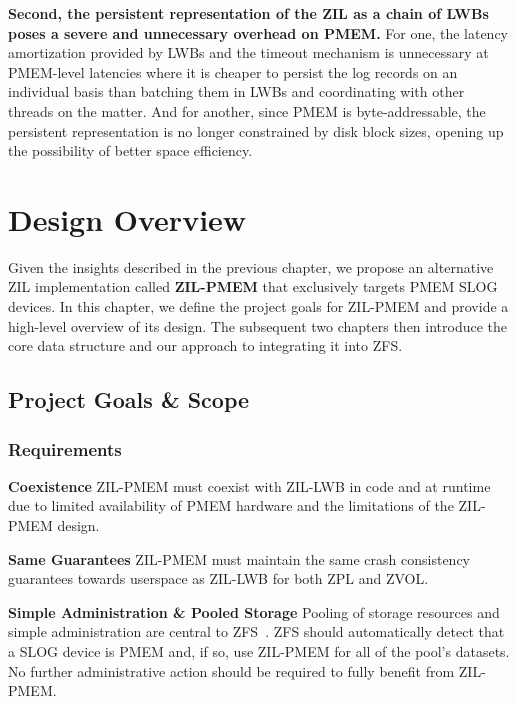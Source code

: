 \documentclass[12pt,a4paper,twoside]{book}
\begin{document}
\textbf{Second, the persistent representation of the ZIL as a chain of LWBs poses a severe and unnecessary overhead on PMEM.}
For one, the latency amortization provided by LWBs and the timeout mechanism is unnecessary at PMEM-level latencies where it is cheaper to persist the log records on an individual basis than batching them in LWBs and coordinating with other threads on the matter.
And for another, since PMEM is byte-addressable, the persistent representation is no longer constrained by disk block sizes, opening up the possibility of better space efficiency.

\chapter{Design Overview}\label{ch:designoverview}
Given the insights described in the previous chapter, we propose an alternative ZIL implementation called \textbf{ZIL-PMEM} that exclusively targets PMEM SLOG devices.
In this chapter, we define the project goals for ZIL-PMEM and provide a high-level overview of its design.
The subsequent two chapters then introduce the core data structure and our approach to integrating it into ZFS.

\section{Project Goals \& Scope}

\newcommand{\csgoal}[1]{\textbf{#1}}

\subsection{Requirements}\label{sec:requirements}

\csgoal{Coexistence}
ZIL-PMEM must coexist with ZIL-LWB in code and at runtime due to limited availability of PMEM hardware and the limitations of the ZIL-PMEM design.

\csgoal{Same Guarantees}
ZIL-PMEM must maintain the same crash consistency guarantees towards userspace as ZIL-LWB for both ZPL and ZVOL.

\csgoal{Simple Administration \& Pooled Storage}
Pooling of storage resources and simple administration are central to ZFS~\cite{bonwickZettabyteFileSystem2003}.
ZFS should automatically detect that a SLOG device is PMEM and, if so, use ZIL-PMEM for all of the pool’s datasets.
No further administrative action should be required to fully benefit from ZIL-PMEM.
\end{document}
